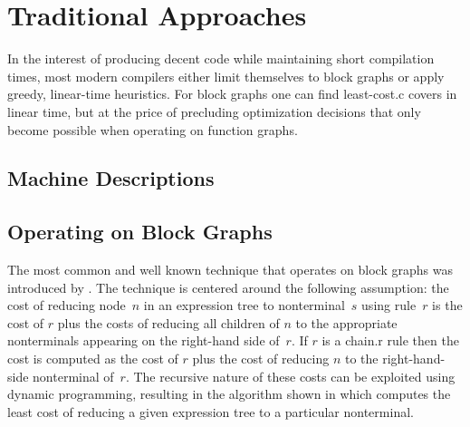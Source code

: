 \section{Traditional Approaches}

In the interest of producing decent code while maintaining short compilation
times, most modern \glspl{compiler} either limit themselves to \glspl{block
  graph} or apply greedy, linear-time heuristics.
%
For \glspl{block graph} one can find \gls{least-cost.c} \glspl{cover} in linear
time, but at the price of precluding optimization decisions that only become
possible when operating on \glspl{function graph}.



\subsection{Machine Descriptions}




\subsection{Operating on Block Graphs}

The most common and well known technique that operates on \glspl{block graph}
was introduced by \textcite{AhoEtAl:1989}.
%
The technique is centered around the following assumption: the cost of reducing
node~$n$ in an \gls{expression tree} to \gls{nonterminal}~$s$ using
\gls{rule}~$r$ is the cost of $r$ plus the costs of reducing all children of $n$
to the appropriate \glspl{nonterminal} appearing on the right-hand side of~$r$.
%
If $r$ is a \gls{chain.r} \gls{rule} then the cost is computed as the cost of
$r$ plus the cost of reducing $n$ to the right-hand-side \gls{nonterminal}
of~$r$.
%
The recursive nature of these costs can be exploited using dynamic programming,
resulting in the algorithm shown in  which
computes the least cost of reducing a given \gls{expression tree} to a
particular \gls{nonterminal}.

